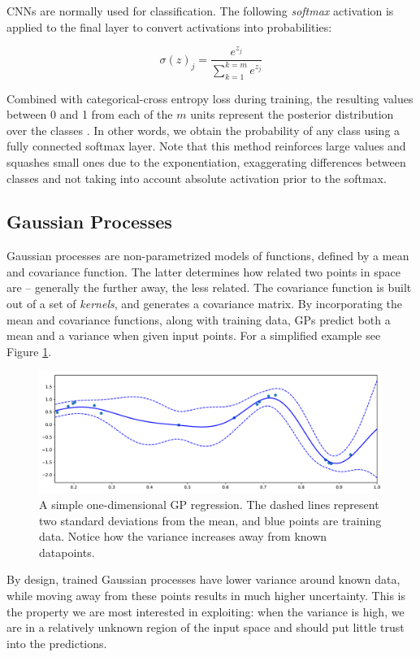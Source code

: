 \documentclass{article}
\begin{document}
CNNs are normally used for classification. The following \textit{softmax} activation is applied to the final layer to convert activations into probabilities:

\[ \sigma(z)_j = \frac{e^{z_j}}{\sum_{k=1}^{k=m}e^{z_j}} \]

Combined with categorical-cross entropy loss during training, the resulting values between 0 and 1 from each of the $m$ units represent the posterior distribution over the classes \cite{bridle1990probabilistic}. In other words, we obtain the probability of any class using a fully connected softmax layer. Note that this method reinforces large values and squashes small ones due to the exponentiation, exaggerating differences between classes and not taking into account absolute activation prior to the softmax. 

\subsection{Gaussian Processes}
\label{sec:background:gp}
Gaussian processes are non-parametrized models of functions, defined by a mean and covariance function. The latter determines how related two points in space are -- generally the further away, the less related. The covariance function is built out of a set of \textit{kernels}, and generates a covariance matrix. By incorporating the mean and covariance functions, along with training data, GPs predict both a mean and a variance when given input points. For a simplified example see Figure \ref{fig:gp:basic}.

\begin{figure}[htb]
\centering
\includegraphics[width=\hsize]{figures/gp_basic.pdf}
\caption{A simple one-dimensional GP regression. The dashed lines represent two standard deviations from the mean, and blue points are training data. Notice how the variance increases away from known datapoints.}
\label{fig:gp:basic}
\end{figure}

By design, trained Gaussian processes have lower variance around known data, while moving away from these points results in much higher uncertainty. This is the property we are most interested in exploiting: when the variance is high, we are in a relatively unknown region of the input space and should put little trust into the predictions.
\end{document}
